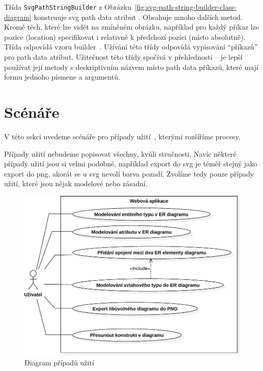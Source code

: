 Třída \texttt{SvgPathStringBuilder} z Obrázku~\ref{fig:svg-path-string-builder-class-diagram} konstruuje \acrshort{svg} path data atribut \cite[\S~9.3]{brinza_svg_2018}.
Obsahuje mnoho dalších metod.
Kromě těch, které lze vidět na zmíněném obrázku, například pro každý příkaz lze pozice (location) specifikovat i relativně k předchozí pozici (místo absolutně).
Třída odpovídá vzoru builder~\cite[s.~110]{gamma_designpatterns_1995}.
Užívání této třídy odpovídá vypisování \enquote{příkazů} pro path data atribut.
Užitečnost této třídy spočívá v přehlednosti -- je lepší používat její metody s deskriptivním názvem místo path data příkazů, které mají formu jednoho písmene a argumentů.

\section{Scénáře}

V této sekci uvedeme scénáře pro případy užití~\cite[s.~65]{overgaard_usecases_2005}, kterými rozšíříme procesy.

Případy užití nebudeme popisovat všechny, kvůli stručnosti.
Navíc některé případy užití jsou si velmi podobné, například export do \acrshort{svg} je téměř stejný jako export do \acrshort{png}, akorát se u \acrshort{svg} nevolí barva pozadí.
Zvolíme tedy pouze případy užití, které jsou nějak modelové nebo zásadní.

\begin{figure}[!htb]
  \centering
  \includegraphics[width=\maxwidth{0.7\textwidth}]{../img/diagrams/use-case-diagram.pdf}
  \caption{Diagram případů užití}
  \label{fig:use-case-diagram}
\end{figure}


